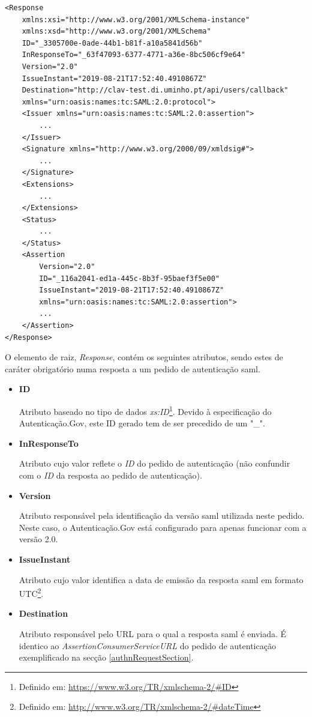 \begin{lstlisting}
<Response 
    xmlns:xsi="http://www.w3.org/2001/XMLSchema-instance" 
    xmlns:xsd="http://www.w3.org/2001/XMLSchema" 
    ID="_3305700e-0ade-44b1-b81f-a10a5841d56b" 
    InResponseTo="_63f47093-6377-4771-a36e-8bc506cf9e64" 
    Version="2.0" 
    IssueInstant="2019-08-21T17:52:40.4910867Z" 
    Destination="http://clav-test.di.uminho.pt/api/users/callback"
    xmlns="urn:oasis:names:tc:SAML:2.0:protocol">
    <Issuer xmlns="urn:oasis:names:tc:SAML:2.0:assertion">
        ...
    </Issuer>
    <Signature xmlns="http://www.w3.org/2000/09/xmldsig#">
        ...
    </Signature>
    <Extensions>
        ...
    </Extensions>
    <Status>
        ...
    </Status>
    <Assertion 
        Version="2.0" 
        ID="_116a2041-ed1a-445c-8b3f-95baef3f5e00" 
        IssueInstant="2019-08-21T17:52:40.4910867Z" 
        xmlns="urn:oasis:names:tc:SAML:2.0:assertion">
        ...
    </Assertion>
</Response>
\end{lstlisting}

\vspace{-7mm}
O elemento de raiz, \emph{Response}, contém os seguintes atributos, sendo estes de caráter obrigatório numa resposta a um pedido de autenticação \gls{saml}.

\begin{itemize}
    \item \textbf{ID}
    
    Atributo baseado no tipo de dados \emph{xs:ID}\footnote{Definido em: \url{https://www.w3.org/TR/xmlschema-2/\#ID}}. Devido à especificação do Autenticação.Gov, este ID gerado tem de ser precedido de um "\_".
    
    \item \textbf{InResponseTo}
    
    Atributo cujo valor reflete o \emph{ID} do pedido de autenticação (não confundir com o \emph{ID} da resposta ao pedido de autenticação).
    
    \item \textbf{Version}
    
    Atributo responsável pela identificação da versão \gls{saml} utilizada neste pedido. Neste caso, o Autenticação.Gov está configurado para apenas funcionar com a versão 2.0.
    
    \item \textbf{IssueInstant}
    
    Atributo cujo valor identifica a data de emissão da resposta \gls{saml} em formato UTC\footnote{Definido em: \url{http://www.w3.org/TR/xmlschema-2/\#dateTime}}.
    
    \item \textbf{Destination}
    
    Atributo responsável pelo URL para o qual a resposta \gls{saml} é enviada. É identico ao \emph{AssertionConsumerServiceURL} do pedido de autenticação exemplificado na secção \ref{authnRequestSection}.
\end{itemize}

